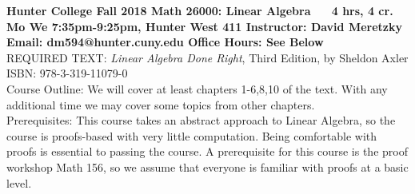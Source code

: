 \documentclass{article}
\begin{document}
	{\bfseries Hunter College
		\newline Fall 2018
		\newline Math 26000: Linear Algebra $\;\;\;\;$ 4 hrs, 4 cr. 
		\newline Mo We 7:35pm-9:25pm, Hunter West 411
		\newline Instructor: David Meretzky
		\newline Email: dm594@hunter.cuny.edu
		\newline Office Hours: See Below
		}\\
	
	REQUIRED TEXT: \textit{Linear Algebra Done Right}, Third Edition, by Sheldon Axler ISBN: 978-3-319-11079-0\\
	
	Course Outline: We will cover at least chapters 1-6,8,10 of the text. With any additional time we may cover some topics from other chapters. \\
	
	Prerequisites: This course takes an abstract approach to Linear Algebra, so the course is proofs-based with very little computation. Being comfortable with proofs is essential to passing the course. A prerequisite for this course is the proof workshop Math 156, so we assume that everyone is familiar with proofs at a basic level. \\
	
\end{document}
